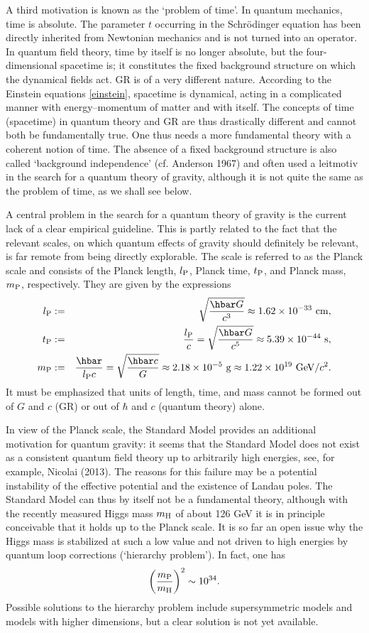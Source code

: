 \documentclass[12pt]{article}
\newcommand{\be}{\begin{equation}}
\newcommand{\ee}{\end{equation}}
\newcommand{\bea}{\begin{eqnarray}}
\newcommand{\eea}{\end{eqnarray}}
\newcommand{\lb}{\label}
\begin{document}
A third motivation is known as the `problem of time'. In quantum
mechanics, time is absolute. The parameter $t$ occurring in the
Schr\"odinger equation has been directly inherited from Newtonian
mechanics and is not turned into an operator. In quantum field theory,
time by itself is no longer absolute, but the four-dimensional
spacetime is; it constitutes the fixed background structure on which
the dynamical fields act. GR is of a very different nature. According
to the Einstein equations \eqref{einstein}, spacetime is dynamical,
acting in a complicated manner with energy--momentum of matter and
with itself. The concepts of time (spacetime) in quantum theory and GR
are thus drastically different and cannot both be fundamentally
true. One thus needs a more fundamental theory with a coherent notion
of time. The absence of a fixed background structure is also called
`background independence' (cf. Anderson 1967) and often used a
leitmotiv in the search for 
a quantum theory of gravity, although it is not quite the same as the
problem of time, as we shall see below.

A central problem in the search for a quantum theory of gravity is the
current lack of a clear empirical guideline. This is partly related to
the fact that the relevant scales, on which quantum effects of gravity
should definitely be relevant, is far remote from being directly
explorable. The scale is referred to as the Planck scale and consists of
the Planck length, $l_{\rm P}$, Planck time, $t_{\rm P}$,
 and Planck mass, $m_{\rm P}$, respectively. They are given by the expressions
\bea 
l_{\rm P} &:=& \sqrt{\frac{\hbar G}{c^3}} \approx 1.62\times 10^{-33}\ 
{\rm cm} ,
\lb{lP}\\
t_{\rm P} &:=& \frac{l_{\rm P}}{c}=\sqrt{\frac{\hbar G}{c^5}}
\approx 5.39\times 10^{-44}\ {\rm s} ,\\
\lb{tP}
m_{\rm P} &:=& \frac{\hbar}{l_{\rm P}c}=\sqrt{\frac{\hbar c}{G}}
\approx 2.18\times 10^{-5}\ {\rm g}\approx 1.22 \times 10^{19}\ {\rm GeV}/c^2 .
\lb{mP}
\eea 
It must be emphasized that units of length, time, and mass cannot be
formed out of $G$ and $c$ (GR) or out of 
$\hbar$ and $c$ (quantum theory) alone. 

In view of the Planck scale, the Standard Model provides an additional
motivation for quantum gravity:
it seems that the Standard Model does not exist as a consistent quantum
field theory up to arbitrarily high energies, see, for example,
Nicolai (2013). The reasons for this
failure may be a potential instability of the effective potential
and the existence of Landau poles. The Standard Model can thus by itself not
be a fundamental theory, although with the recently measured
Higgs mass $m_{\rm H}$ of about 126 GeV it is in principle conceivable that it
holds up to the Planck scale. It is so far an open issue why the Higgs
mass is stabilized at such a low value and not driven to high energies
by quantum loop corrections (`hierarchy problem'). In fact, one has
\be
\left(\frac{m_{\rm P}}{m_{\rm H}}\right)^2\sim 10^{34}.
\ee
Possible solutions to the hierarchy problem include supersymmetric
models and models with higher dimensions, but a clear solution is not
yet available.
\end{document}
